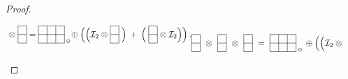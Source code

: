 \documentclass[a4paper,12pt]{amsart}
\begin{document}
\begin{proof}
\begin{equation}
{{\raisebox{12pt}{$\;\otimes\;$}
\begin{picture}(10,30)
\put(0,5){\line(1,0){10}}
\put(0,15){\line(1,0){10}}
\put(0,25){\line(1,0){10}}
\put(0,5){\line(0,1){20}}
\put(10,5){\line(0,1){20}}
\end{picture}
\raisebox{12pt}{$\;=\;$}
\begin{picture}(35,30)
\put(0,5){\line(1,0){30}}
\put(0,15){\line(1,0){30}}
\put(0,25){\line(1,0){30}}
\put(0,5){\line(0,1){20}}
\put(10,5){\line(0,1){20}}
\put(20,5){\line(0,1){20}}
\put(30,5){\line(0,1){20}}
\put(32,7){\makebox(0,0)[l]{$\circ$}}
\end{picture}
\raisebox{12pt}{$\;\oplus\:\Big(\Big({\mathcal I}_2\:\otimes\;$}
\begin{picture}(10,30)
\put(0,5){\line(1,0){10}}
\put(0,15){\line(1,0){10}}
\put(0,25){\line(1,0){10}}
\put(0,5){\line(0,1){20}}
\put(10,5){\line(0,1){20}}
\end{picture}
\raisebox{12pt}{$\;\Big)\:+\:\Big(\;$}
\begin{picture}(10,30)
\put(0,5){\line(1,0){10}}
\put(0,15){\line(1,0){10}}
\put(0,25){\line(1,0){10}}
\put(0,5){\line(0,1){20}}
\put(10,5){\line(0,1){20}}
\end{picture}
\raisebox{12pt}{$\;\otimes\:{\mathcal I}_2\Big)\Big)\,.$}}}{\raisebox{-10pt}{\begin{picture}(10,30)
\put(0,5){\line(1,0){10}}
\put(0,15){\line(1,0){10}}
\put(0,25){\line(1,0){10}}
\put(0,5){\line(0,1){20}}
\put(10,5){\line(0,1){20}}
\end{picture}
\raisebox{12pt}{$\;\otimes\;$}
\begin{picture}(10,30)
\put(0,5){\line(1,0){10}}
\put(0,15){\line(1,0){10}}
\put(0,25){\line(1,0){10}}
\put(0,5){\line(0,1){20}}
\put(10,5){\line(0,1){20}}
\end{picture}
\raisebox{12pt}{$\;\otimes\;$}
\begin{picture}(10,30)
\put(0,5){\line(1,0){10}}
\put(0,15){\line(1,0){10}}
\put(0,25){\line(1,0){10}}
\put(0,5){\line(0,1){20}}
\put(10,5){\line(0,1){20}}
\end{picture}
\raisebox{12pt}{$\;=\;$}
\begin{picture}(35,30)
\put(0,5){\line(1,0){30}}
\put(0,15){\line(1,0){30}}
\put(0,25){\line(1,0){30}}
\put(0,5){\line(0,1){20}}
\put(10,5){\line(0,1){20}}
\put(20,5){\line(0,1){20}}
\put(30,5){\line(0,1){20}}
\put(32,7){\makebox(0,0)[l]{$\circ$}}
\end{picture}
\raisebox{12pt}{$\;\oplus\:\Big(\Big({\mathcal I}_2\:\otimes\;$}
\begin{picture}(10,30)

\end{picture}}}
\end{equation}
\end{proof}
\end{document}
